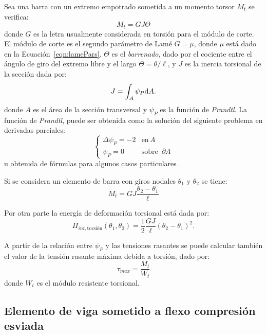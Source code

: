 Sea una barra con un extremo empotrado sometida a un momento torsor $M_t$ se verifica:
%
\begin{equation}
	M_t = G J \Theta
\end{equation}
%
donde $G$ es la letra usualmente considerada en torsión para el módulo de corte. %
%
El módulo de corte es el segundo parámetro de Lamé $G=\mu$, donde $\mu$ está dado en la Ecuación~\eqref{eqn:lamePars}. %
%
$\Theta$ es el \textit{barrenado}, dado por el cociente entre el ángulo de giro del extremo libre y el largo  $\Theta = \theta / \ell$, y $J$ es la inercia torsional de la sección dada por:
%
\begin{equation}
	J = \int_{A} \psi_P {\text{d}} A.
\end{equation}
%
donde $A$ es el área de la sección transversal y $\psi_P$ es la función de \emph{Prandtl}. %
%
La función de \emph{Prandtl}, puede ser obtenida como la solución del siguiente problema en derivadas parciales:
%
\begin{equation}
	\left\{
	\begin{array}{lr}
		\Delta \psi_P = -2 & \text{en} \, A\\
		\psi_P = 0 & \text{sobre } \, \partial A
	\end{array}
	\right.
\end{equation} 
%
u obtenida de fórmulas para algunos casos particulares \citep{Young2001}.


Si se considera un elemento de barra con giros nodales $\theta_1$ y $\theta_2$ se tiene:
%
\begin{equation}
	M_t = G J \frac{\theta_2 - \theta_1}{\ell}
\end{equation}

Por otra parte la energía de deformación torsional está dada por:
%
\begin{equation}
	\Pi_{int,\text{torsión}}(\theta_1,\theta_2) = \frac{1}{2} \frac{G J}{\ell} \left( \theta_2 - \theta_1\right)^2.
\end{equation}
%

A partir de la relación entre $\psi_P$ y las tensiones rasantes se puede calcular también el valor de la tensión rasante máxima debida a torsión, dado por:
%
\begin{equation}
	\tau_{max} = \frac{M_t}{W_t}
\end{equation}
%
donde $W_t$ es el módulo resistente torsional.



\subsection{Elemento de viga sometido a flexo compresión esviada}

